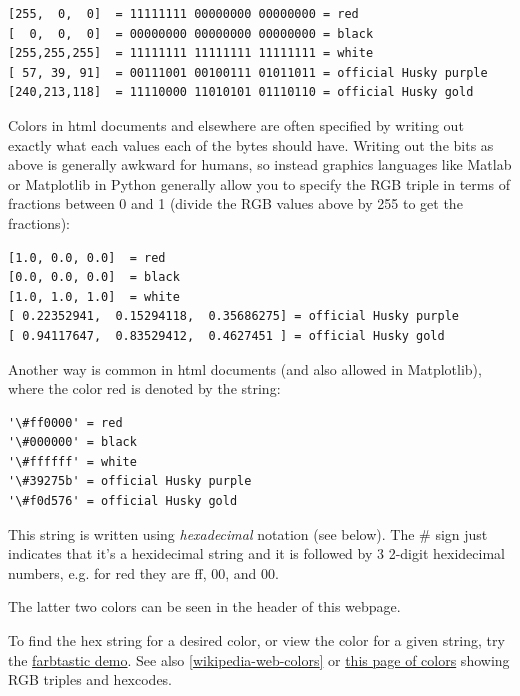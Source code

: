 \documentclass[letterpaper,10pt,english]{sphinxmanual}
\begin{document}
\begin{Verbatim}[commandchars=\\\{\}]
[255,  0,  0]  = 11111111 00000000 00000000 = red
[  0,  0,  0]  = 00000000 00000000 00000000 = black
[255,255,255]  = 11111111 11111111 11111111 = white
[ 57, 39, 91]  = 00111001 00100111 01011011 = official Husky purple
[240,213,118]  = 11110000 11010101 01110110 = official Husky gold
\end{Verbatim}

Colors in html documents and elsewhere are often specified by writing out
exactly what each values each of the bytes should have.  Writing out the
bits as above is generally awkward for humans, so instead graphics languages
like Matlab or Matplotlib in Python generally allow you to specify the
RGB triple in terms of fractions between 0 and 1 (divide the RGB values
above by 255 to get the fractions):

\begin{Verbatim}[commandchars=\\\{\}]
[1.0, 0.0, 0.0]  = red
[0.0, 0.0, 0.0]  = black
[1.0, 1.0, 1.0]  = white
[ 0.22352941,  0.15294118,  0.35686275] = official Husky purple
[ 0.94117647,  0.83529412,  0.4627451 ] = official Husky gold
\end{Verbatim}

Another way is common in html documents (and also allowed in Matplotlib),
where the color red is denoted by the string:

\begin{Verbatim}[commandchars=\\\{\}]
'\#ff0000' = red
'\#000000' = black
'\#ffffff' = white
'\#39275b' = official Husky purple
'\#f0d576' = official Husky gold
\end{Verbatim}

This string is written using \emph{hexadecimal} notation (see below).
The \# sign just
indicates that it's a hexidecimal string and it is followed by 3 2-digit
hexidecimal numbers, e.g. for red they are ff, 00, and 00.

The latter two colors can be seen in the header of this webpage.

To find the hex string for a desired color, or view the color for a given
string, try the \href{http://acko.net/dev/farbtastic}{farbtastic demo}.
See also \href{http://en.wikipedia.org/wiki/Web\_colors}{{[}wikipedia-web-colors{]}}
or \href{http://www.webdiner.com/annexe/hexcode/hexcode.htm}{this page of colors}
showing RGB triples and hexcodes.
\end{document}
